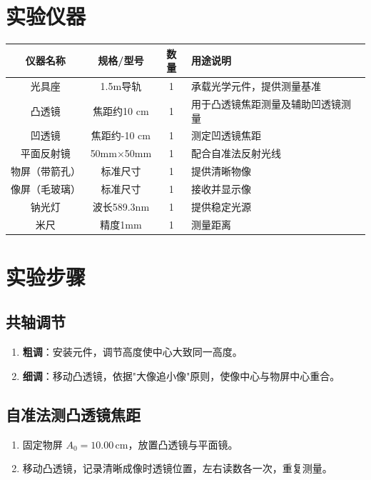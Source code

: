 \documentclass[12pt,a4paper]{article}
\begin{document}
\section{实验仪器}

\begin{table}[H]
\centering
\begin{tabular}{|c|c|c|p{6cm}|}
\hline
仪器名称 & 规格/型号 & 数量 & 用途说明 \\
\hline
光具座 & 1.5m导轨 & 1 & 承载光学元件，提供测量基准 \\
\hline
凸透镜 & 焦距约10 cm & 1 & 用于凸透镜焦距测量及辅助凹透镜测量 \\
\hline
凹透镜 & 焦距约-10 cm & 1 & 测定凹透镜焦距 \\
\hline
平面反射镜 & 50mm×50mm & 1 & 配合自准法反射光线 \\
\hline
物屏（带箭孔） & 标准尺寸 & 1 & 提供清晰物像 \\
\hline
像屏（毛玻璃） & 标准尺寸 & 1 & 接收并显示像 \\
\hline
钠光灯 & 波长589.3nm & 1 & 提供稳定光源 \\
\hline
米尺 & 精度1mm & 1 & 测量距离 \\
\hline
\end{tabular}
\end{table}

\section{实验步骤}

\subsection{共轴调节}
\begin{enumerate}
\item \textbf{粗调}：安装元件，调节高度使中心大致同一高度。
\item \textbf{细调}：移动凸透镜，依据"大像追小像"原则，使像中心与物屏中心重合。
\end{enumerate}

\subsection{自准法测凸透镜焦距}
\begin{enumerate}
\item 固定物屏 $A_0 = 10.00 \, \text{cm}$，放置凸透镜与平面镜。
\item 移动凸透镜，记录清晰成像时透镜位置，左右读数各一次，重复测量。
\end{enumerate}
\end{document}
